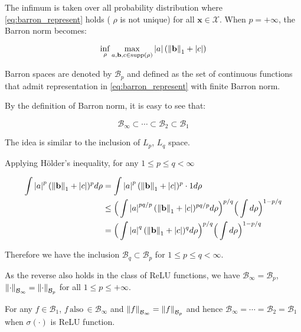 The infimum is taken over all probability distribution where
\eqref{eq:barron_represent} holds ( $\rho$ is not unique) for all $\mathbf{x} \in
    \mathcal{X}$. When $p = + \infty$, the Barron norm becomes:

\begin{equation}
    \inf_{\rho} \max_{a, \mathbf{b}, c \in \operatorname{supp}(\rho)} \left| a \right| (\left\| \mathbf{b} \right\|_1 + \left| c \right|)
\end{equation}

Barron spaces are denoted by $\mathcal{B}_p$ and defined as the set of
\textit{}{continuous} functions that admit representation in
\eqref{eq:barron_represent} with finite Barron norm.

By the definition of Barron norm, it is easy to see that:

\begin{equation}
    \mathcal{B}_{\infty} \subset \cdots \subset \mathcal{B}_{2} \subset \mathcal{B}_1
\end{equation}



The idea is similar to the inclusion of $L_p$, $L_q$ space.

Applying Hölder's inequality, for any $1 \leq p \leq q < \infty$

\begin{align*}
    \int \left| a \right|^p (\left\| \mathbf{b} \right\|_1 + \left| c \right|)^p d\rho
     & = \int \left| a \right|^p (\left\| \mathbf{b} \right\|_1 + \left| c \right|)^p \cdot 1 d\rho                                                    \\
     & \leq \Big(\int \left| a \right|^{pq/p} (\left\| \mathbf{b} \right\|_1 + \left| c \right|)^{pq/p} d\rho \Big)^{p/q} \Big(\int d\rho\Big)^{1-p/q} \\
     & = \Big(\int \left| a \right|^q (\left\| \mathbf{b} \right\|_1 + \left| c \right|)^q d\rho \Big)^{p/q} \Big(\int d\rho\Big)^{1-p/q}
\end{align*}

Therefore we have the inclusion $\mathcal{B}_{q} \subset \mathcal{B}_p$ for $1
    \leq p \leq q < \infty$. 

As the reverse also holds in the class of ReLU functions,  we have
$\mathcal{B}_{\infty} = \mathcal{B}_p$, $\left\lVert\cdot\right\rVert_{\mathcal{B}_\infty} =
    \left\lVert\cdot\right\rVert_{\mathcal{B}_p}$  for all $1 \leq p \leq +\infty$.

\begin{lemma}\label{lamma:equivalence_barron_space}

    For any $f \in \mathcal{B}_1$, $f
        \,\text{also}\, \in \mathcal{B}_{\infty}$ and $\left\lVert f\right\rVert_{\mathcal{B}_\infty} =
        \left\lVert f\right\rVert_{\mathcal{B}_p}$ and hence $ \mathcal{B}_{\infty} = \cdots =
        \mathcal{B}_{2} = \mathcal{B}_1$ when $\sigma(\cdot)$ is ReLU function.
\end{lemma}

